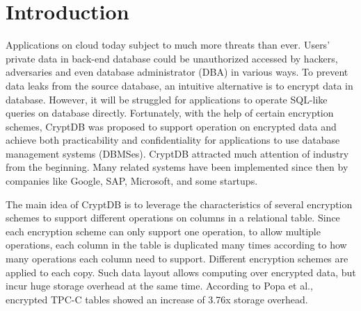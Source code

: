 \section{Introduction}

Applications on cloud today subject to much more threats than ever. Users' private data in back-end database could be unauthorized accessed by hackers, adversaries and even database administrator (DBA) in various ways. To prevent data leaks from the source database, an intuitive alternative is to encrypt data in database. However, it will be struggled for applications to operate SQL-like queries on database directly. Fortunately, with the help of certain encryption schemes, CryptDB \citep{popa2011cryptdb} was proposed to support operation on encrypted data and achieve both practicability and confidentiality for applications to use database management systems (DBMSes). CryptDB attracted much attention of industry from the beginning. Many related systems have been implemented since then by companies like Google, SAP, Microsoft, and some startups\citep{cryptdbsite, kerschbaum2013encrypted}.


The main idea of CryptDB is to leverage the characteristics of several encryption schemes to support different operations on columns in a relational table.  Since each encryption scheme can only support one operation, to allow multiple operations, each column in the table is duplicated many times according to how many operations each column need to support. Different encryption schemes are applied to each copy. Such data layout allows computing over encrypted data, but incur huge storage overhead at the same time. According to Popa et al.\citep{popa2011cryptdb}, encrypted TPC-C tables showed an increase of 3.76x storage overhead.

